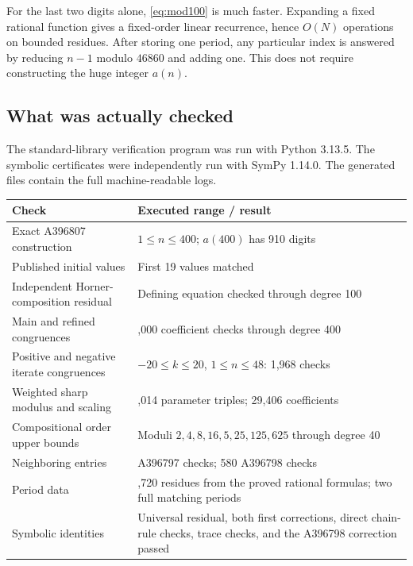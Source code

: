 \documentclass[11pt,letterpaper]{article}
\theoremstyle{definition}
\theoremstyle{remark}
\begin{document}
For the last two digits alone, \eqref{eq:mod100} is much faster.
Expanding a fixed rational function gives a fixed-order linear
recurrence, hence $O(N)$ operations on bounded residues.
After storing one period, any particular index is answered by reducing
$n-1$ modulo $46860$ and adding one.  This does not require constructing
the huge integer $a(n)$.

\subsection{What was actually checked}
The standard-library verification program was run with Python 3.13.5.
The symbolic certificates were independently run with SymPy 1.14.0.
The generated files contain the full machine-readable logs.

\begin{center}
\begin{tabular}{@{}>{\raggedright\arraybackslash}p{}>{\raggedright\arraybackslash}p{}@{}}
\toprule
Check & Executed range / result\\
\midrule
Exact A396807 construction & $1\leq n\leq400$; $a(400)$ has 910 digits\\[3pt]
Published initial values & First 19 values matched\\[3pt]
Independent Horner-composition residual & Defining equation checked
 through degree 100\\[3pt]
Main and refined congruences & 2,000 coefficient checks through degree 400\\[3pt]
Positive and negative iterate congruences & $-20\leq k\leq20$,
 $1\leq n\leq48$: 1,968 checks\\[3pt]
Weighted sharp modulus and scaling & 1,014 parameter triples;
 29,406 coefficients\\[3pt]
Compositional order upper bounds & Moduli $2,4,8,16,5,25,125,625$
 through degree 40\\[3pt]
Neighboring entries & 100 A396797 checks; 580 A396798 checks\\[3pt]
Period data & 93,720 residues from the proved rational formulas;
 two full matching periods\\[3pt]
Symbolic identities & Universal residual, both first corrections,
 direct chain-rule checks, trace checks, and the A396798 correction passed\\
\bottomrule
\end{tabular}
\end{center}
\end{document}
